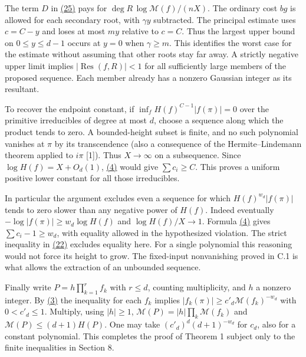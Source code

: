 \documentclass[11pt,a4paper]{article}
\begin{document}
The term \(D\) in \hyperref[eq:25]{(25)} pays for \(\deg R\,\log\mathcal M(f)/(nX)\). The ordinary cost \(bg\) is allowed for each secondary root, with \(\gamma y\) subtracted. The principal estimate uses \(c=C-y\) and loses at most \(my\) relative to \(c=C\). Thus the largest upper bound on \(0\le y\le d-1\) occurs at \(y=0\) when \(\gamma\ge m\). This identifies the worst case for the estimate without assuming that other roots stay far away. A strictly negative upper limit implies \(|\operatorname{Res}(f,R)|<1\) for all sufficiently large members of the proposed sequence. Each member already has a nonzero Gaussian integer as its resultant.

To recover the endpoint constant, if \(\inf_f H(f)^{C-1}|f(\pi)|=0\) over the primitive irreducibles of degree at most \(d\), choose a sequence along which the product tends to zero. A bounded-height subset is finite, and no such polynomial vanishes at \(\pi\) by its transcendence (also a consequence of the Hermite--Lindemann theorem applied to \(i\pi\) {[}1{]}). Thus \(X\to\infty\) on a subsequence. Since \(\log H(f)=X+O_d(1)\), \hyperref[eq:4]{(4)} would give \(\sum c_i\ge C\). This proves a uniform positive lower constant for all those irreducibles.

In particular the argument excludes even a sequence for which \(H(f)^{w_d}|f(\pi)|\) tends to zero slower than any negative power of \(H(f)\). Indeed eventually \(-\log|f(\pi)|\ge w_d\log H(f)\) and \(\log H(f)/X\to1\). Formula \hyperref[eq:4]{(4)} gives \(\sum c_i-1\ge w_d\), with equality allowed in the hypothesized violation. The strict inequality in \hyperref[eq:22]{(22)} excludes equality here. For a single polynomial this reasoning would not force its height to grow. The fixed-input nonvanishing proved in C.1 is what allows the extraction of an unbounded sequence.

Finally write \(P=h\prod_{k=1}^r f_k\) with \(r\le d\), counting multiplicity, and \(h\) a nonzero integer. By \hyperref[eq:3]{(3)} the inequality for each \(f_k\) implies \(|f_k(\pi)|\ge c'_d\mathcal M(f_k)^{-w_d}\) with \(0<c'_d\le1\). Multiply, using \(|h|\ge1\), \(\mathcal M(P)=|h|\prod_k\mathcal M(f_k)\) and \(\mathcal M(P)\le(d+1)H(P)\). One may take \((c'_d)^d(d+1)^{-w_d}\) for \(c_d\), also for a constant polynomial. This completes the proof of Theorem 1 subject only to the finite inequalities in Section 8.
\end{document}
